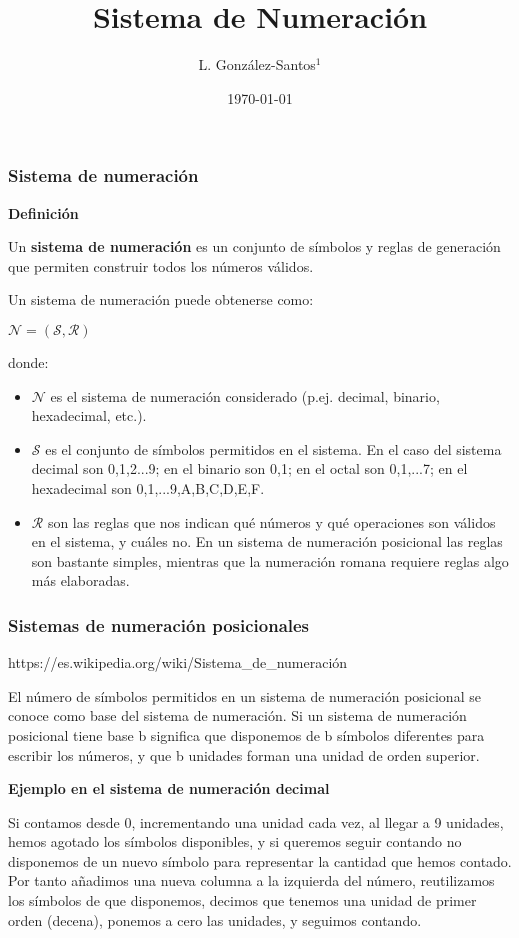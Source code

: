 \documentclass{beamer}
\title[santosg572@gmail.com]{Sistema de Numeración}
\author[L. González-Santos]{
L. González-Santos$^{1}$}
\institute[EDEN \& HELL]{
  $^{1}$
  Instituto de Neurobiología, UNAM\\
  Campus Juriquilla, Qro.
  \and
  \texttt{lgs@unam.mx}
}
\date{\today}
\begin{document}
\frame{\titlepage}

\begin{frame}
\frametitle{Sistema de numeración}

\textbf{Definición}

\hfill

Un \textbf{sistema de numeración} es un conjunto de símbolos y reglas de generación que permiten construir todos los números 
válidos. 

\hfill

Un sistema de numeración puede obtenerse como:

$\mathcal{N} =(\mathcal {S}, \mathcal {R})$

donde:

\begin{tiny}
\begin{itemize}
\item $\mathcal{N}$ es el sistema de numeración considerado (p.ej. decimal, binario, hexadecimal, etc.).
\item $\mathcal{S}$ es el conjunto de símbolos permitidos en el sistema. En el caso del sistema decimal son {0,1,2...9}; en el 
binario son {0,1}; en el octal son {0,1,...7}; en el hexadecimal son {0,1,...9,A,B,C,D,E,F}.
\item $\mathcal{R}$ son las reglas que nos indican qué números y qué operaciones son válidos en el sistema, y cuáles no. En un 
sistema de numeración posicional las reglas son bastante simples, mientras que la numeración romana requiere reglas algo más 
elaboradas.
\end{itemize}
\end{tiny}
\end{frame}  

\begin{frame}
\frametitle{Sistemas de numeración posicionales}

https://es.wikipedia.org/wiki/Sistema_de_numeración

El número de símbolos permitidos en un sistema de numeración posicional se conoce como base del sistema de numeración. Si un 
sistema de numeración posicional tiene base b significa que disponemos de b símbolos diferentes para escribir los números, y 
que b unidades forman una unidad de orden superior.


\hfill

\textbf{Ejemplo en el sistema de numeración decimal}

\hfill

Si contamos desde 0, incrementando una unidad cada vez, al llegar a 9 unidades, hemos agotado los símbolos disponibles, y si 
queremos seguir contando no disponemos de un nuevo símbolo para representar la cantidad que hemos contado. Por tanto añadimos 
una nueva columna a la izquierda del número, reutilizamos los símbolos de que disponemos, decimos que tenemos una unidad de 
primer orden (decena), ponemos a cero las unidades, y seguimos contando.


\end{frame}
\end{document}
